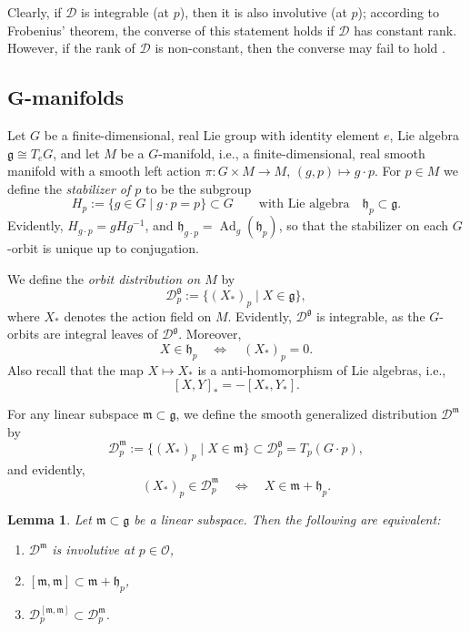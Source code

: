 \documentclass[10pt,a4paper]{amsart}
\numberwithin{equation}{section}
\newtheorem{Lemma}[Theorem]{Lemma}
\newcommand{\be}{\begin{equation}}
\newcommand{\ee}{\end{equation}}
\newcommand{\ocal}{\mathcal{O}}
\newcommand{\dcal}{\mathcal{D}}
\newcommand{\m}{\mathfrak{m}}
\newcommand{\g}{{\mathfrak{g}}}
\newcommand{\h}{{\mathfrak h}}
\renewcommand{\m}{{\mathfrak m}}
\begin{document}
Clearly, if $\dcal$ is integrable (at $p$), then it is also involutive (at $p$); according to Frobenius' theorem, the converse of this statement holds if $\dcal$ has constant rank. However, if the rank of $\dcal$ is non-constant, then the converse may fail to hold \cite{Sussmann-1973}.

\subsection[G-manifolds]{$\boldsymbol{G}$-manifolds}\label{subsec: G-manifolds}

Let $G$ be a finite-dimensional, real Lie group with identity element $e$, Lie algebra $\g\cong T_{e}G$, and let $M$ be a $G$-manifold, i.e., a finite-dimensional, real smooth manifold with a smooth left action $\pi\colon G \times M \to M$, $(g, p) \mapsto g \cdot p$. For $p \in M$ we define the {\em stabilizer of $p$} to be the subgroup
\[
H_p := \{ g \in G \mid g \cdot p = p\} \subset G \qquad \text{with Lie algebra} \quad \h_p \subset \g.
\]
Evidently, $H_{g \cdot p} = gHg^{-1}$, and $\h_{g \cdot p} = \operatorname{Ad}_g(\h_p)$, so that the stabilizer on each $G$-orbit is unique up to conjugation.

We define the {\em orbit distribution on $M$} by
\[%
\dcal^\g_p := \{(X_\ast)_p \mid X \in \g\},
\]
where $X_\ast$ denotes the action field on $M$. Evidently, $\dcal^\g$ is integrable, as the $G$-orbits are integral leaves of $\dcal^\g$.
Moreover,
\[ %
X \in \h_p \quad \Leftrightarrow \quad (X_\ast)_p = 0.
\]
Also recall that the map $X \mapsto X_\ast$ is a anti-homomorphism of Lie algebras, i.e.,
\be \label{eq:action-comm}
{}[X, Y]_\ast = - [X_\ast, Y_\ast].
\ee

For any linear subspace $\m \subset \g$, we define the smooth generalized distribution $\dcal^\m$ by
\be \label{eq:Dm}
\dcal^\m_p := \{(X_\ast)_p \mid X \in \m\} \subset \dcal^\g_p = T_p(G \cdot p),
\ee
and evidently,
\be \label{eq:Dm-criterion}
(X_\ast)_p \in \dcal^\m_p \quad \Leftrightarrow \quad X \in \m + \h_p.
\ee

\begin{Lemma} \label{lem:involutive}
Let $\m \subset \g$ be a linear subspace. Then the following are equivalent:
\begin{enumerate}\itemsep=0pt
\item[$(1)$] $\dcal^\m$ is involutive at $p \in \ocal$,
\item[$(2)$] $[\m, \m] \subset \m + \h_p$,
\item[$(3)$] $\dcal^{[\m, \m]}_p \subset \dcal^\m_p$.
\end{enumerate}
\end{Lemma}
\end{document}
